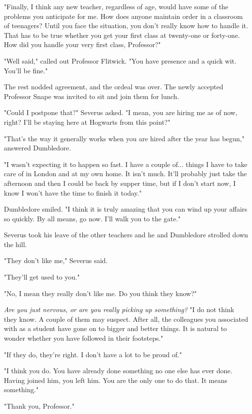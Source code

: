 \documentclass[a4paper,11pt]{article}
\begin{document}
"Finally, I think any new teacher, regardless of age, would have some of the problems you anticipate for me. How does anyone maintain order in a classroom of teenagers? Until you face the situation, you don't really know how to handle it. That has to be true whether you get your first class at twenty-one or forty-one. How did you handle your very first class, Professor?"

"Well said," called out Professor Flitwick. "You have presence and a quick wit. You'll be fine."

The rest nodded agreement, and the ordeal was over. The newly accepted Professor Snape was invited to sit and join them for lunch.

"Could I postpone that?" Severus asked. "I mean, you are hiring me as of now, right? I'll be staying here at Hogwarts from this point?"

"That's the way it generally works when you are hired after the year has begun," answered Dumbledore.

"I wasn't expecting it to happen so fast. I have a couple of... things I have to take care of in London and at my own home. It isn't much. It'll probably just take the afternoon and then I could be back by supper time, but if I don't start now, I know I won't have the time to finish it today."

Dumbledore smiled. "I think it is truly amazing that you can wind up your affairs so quickly. By all means, go now. I'll walk you to the gate."

Severus took his leave of the other teachers and he and Dumbledore strolled down the hill.

"They don't like me," Severus said.

"They'll get used to you."

"No, I mean they really don't like me. Do you think they know?"

\emph{Are you just nervous, or are you really picking up something?} "I do not think they know. A couple of them may suspect. After all, the colleagues you associated with as a student have gone on to bigger and better things. It is natural to wonder whether you have followed in their footsteps."

"If they do, they're right. I don't have a lot to be proud of."

"I think you do. You have already done something no one else has ever done. Having joined him, you left him. You are the only one to do that. It means something."

"Thank you, Professor."
\end{document}
